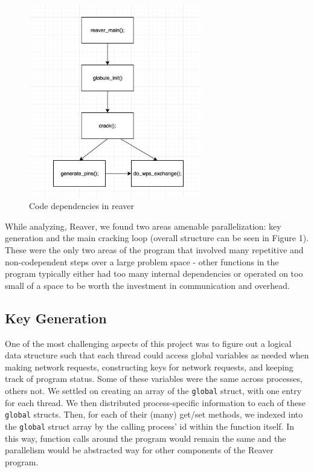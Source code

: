 \documentclass[a4paper]{article}
\begin{document}
\begin{figure}[h!]
\centering
\includegraphics[width=75mm]{reaver.png}
\caption{Code dependencies in reaver\label{overflow}}
\end{figure}

While analyzing, Reaver, we found two areas amenable parallelization: key generation and the main cracking loop (overall structure can be seen in Figure 1). These were the only two areas of the program that involved many repetitive and non-codependent steps over a large problem space - other functions in the program typically either had too many internal dependencies or operated on too small of a space to be worth the investment in communication and overhead.

\subsection{Key Generation}

One of the most challenging aspects of this project was to figure out a logical
data structure such that each thread could access global variables as needed
when making network requests, constructing keys for network requests, and keeping track of program status. Some of these variables were the same across processes, others not.
We settled on creating an array of the \texttt{global} struct, with one entry for each
thread. We then distributed process-specific information to each of these
\texttt{global} structs. Then, for each of their (many) get/set methods, we
indexed into the \texttt{global} struct array by the calling process' id within the
function itself. In this way, function calls around the program would remain the same
and the parallelism would be abstracted way for other components of the Reaver program.
\end{document}
